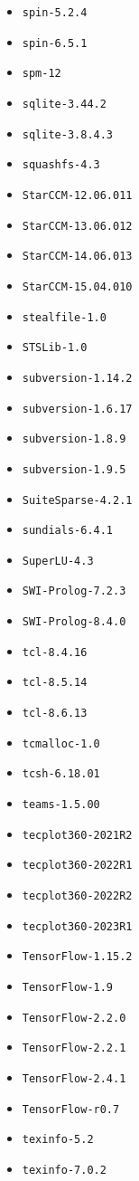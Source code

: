 \begin{itemize}
\item \verb|spin-5.2.4|
\item \verb|spin-6.5.1|
\item \verb|spm-12|
\item \verb|sqlite-3.44.2|
\item \verb|sqlite-3.8.4.3|
\item \verb|squashfs-4.3|
\item \verb|StarCCM-12.06.011|
\item \verb|StarCCM-13.06.012|
\item \verb|StarCCM-14.06.013|
\item \verb|StarCCM-15.04.010|
\item \verb|stealfile-1.0|
\item \verb|STSLib-1.0|
\item \verb|subversion-1.14.2|
\item \verb|subversion-1.6.17|
\item \verb|subversion-1.8.9|
\item \verb|subversion-1.9.5|
\item \verb|SuiteSparse-4.2.1|
\item \verb|sundials-6.4.1|
\item \verb|SuperLU-4.3|
\item \verb|SWI-Prolog-7.2.3|
\item \verb|SWI-Prolog-8.4.0|
\item \verb|tcl-8.4.16|
\item \verb|tcl-8.5.14|
\item \verb|tcl-8.6.13|
\item \verb|tcmalloc-1.0|
\item \verb|tcsh-6.18.01|
\item \verb|teams-1.5.00|
\item \verb|tecplot360-2021R2|
\item \verb|tecplot360-2022R1|
\item \verb|tecplot360-2022R2|
\item \verb|tecplot360-2023R1|
\item \verb|TensorFlow-1.15.2|
\item \verb|TensorFlow-1.9|
\item \verb|TensorFlow-2.2.0|
\item \verb|TensorFlow-2.2.1|
\item \verb|TensorFlow-2.4.1|
\item \verb|TensorFlow-r0.7|
\item \verb|texinfo-5.2|
\item \verb|texinfo-7.0.2|

\end{itemize}
